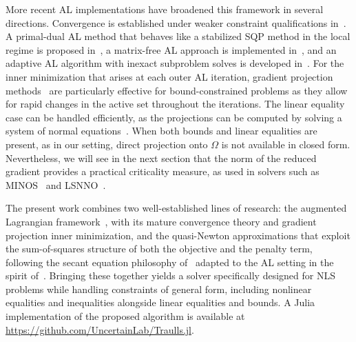 \documentclass{article}
\numberwithin{equation}{section}
\theoremstyle{plain}
\begin{document}
	More recent AL implementations have broadened this framework in several directions. Convergence is established under weaker constraint qualifications in~\cite{andreani-etal:2008}. A primal-dual AL method that behaves like a stabilized SQP method in the local regime is proposed in~\cite{gillrobinson:2012}, a matrix-free AL approach is implemented in~\cite{arreckx-etal:2016}, and an adaptive AL algorithm with inexact subproblem solves is developed in~\cite{curtis-etal:2015}.
	For the inner minimization that arises at each outer AL iteration, gradient projection methods~\cite{moretoraldo:1991, linmore:1999a} are particularly effective for bound-constrained problems as they allow for rapid changes in the active set throughout the iterations. The linear equality case can be handled efficiently, as the projections can be computed by solving a system of normal equations~\cite{gould-etal:2001}.
	When both bounds and linear equalities are present, as in our setting, direct projection onto $\Omega$ is not available in closed form. Nevertheless, we will see in the next section that the norm of the reduced gradient provides a practical criticality measure, as used in solvers such as MINOS~\cite{murtaghsaunders:1978} and LSNNO~\cite{tointtuyttens:1992}.
	
	The present work combines two well-established lines of research: the augmented Lagrangian framework~\cite{conn-etal:1988a}, with its mature convergence theory and gradient projection inner minimization, and the quasi-Newton approximations that exploit the sum-of-squares structure of both the objective and the penalty term, following the secant equation philosophy of~\cite{biggs:1977,dennisetal:1981} adapted to the AL setting in the spirit of~\cite{li-etal:2002}. Bringing these together yields a solver specifically designed for NLS problems while handling constraints of general form, including nonlinear equalities and inequalities alongside linear equalities and bounds. A Julia~\cite{bezanson-etal:2017} implementation of the proposed algorithm is available at \url{https://github.com/UncertainLab/Traulls.jl}.
	
\end{document}
